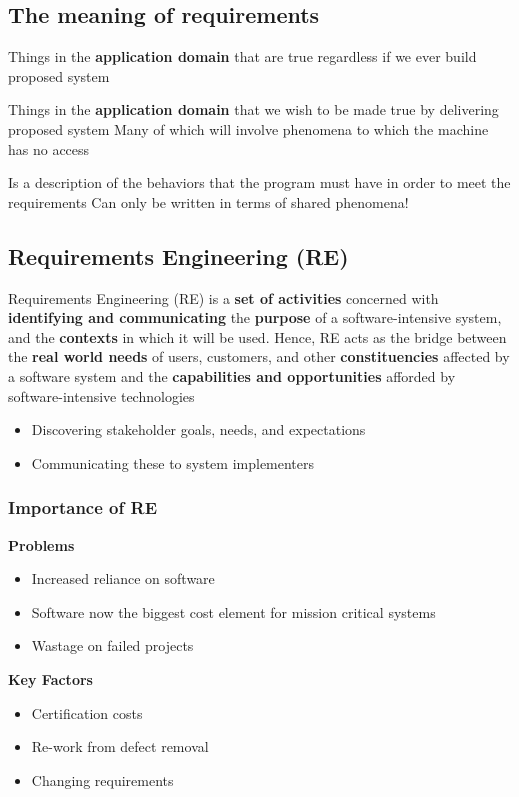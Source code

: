 \documentclass{report}
\begin{document}
\subsection{The meaning of requirements}
\begin{description}
  \setlength\itemsep{-.25em}
  \item [Domain Properties] Things in the \textbf{application domain} that are true regardless if we ever build  proposed system
  \item [Requirements] Things in the \textbf{application domain} that we wish to be made true by delivering proposed system\newline
Many of which will involve phenomena to which the machine has no
access
  \item [A Specification] Is a description of the behaviors that the program must have in order to meet the requirements\newline 
Can only be written in terms of shared phenomena!
\end{description}

\subsection{Requirements Engineering (RE)}
Requirements Engineering (RE) is a \textbf{set of activities} concerned with \textbf{identifying and communicating} the \textbf{purpose} of a software-intensive system, and the \textbf{contexts} in which it will be used. Hence, RE acts as the bridge between the \textbf{real world needs} of users, customers, and other \textbf{constituencies} affected by a software system and the \textbf{capabilities and opportunities} afforded by software-intensive technologies
\begin{itemize}
  \setlength\itemsep{-.25em}
  \item Discovering stakeholder goals, needs, and expectations
  \item Communicating these to system implementers
\end{itemize}

\subsubsection{Importance of RE}
\textbf{Problems}
\begin{itemize}
  \setlength\itemsep{-.25em}
  \item Increased reliance on software
  \item Software now the biggest cost element for mission critical systems
  \item Wastage on failed projects
\end{itemize}
\textbf{Key Factors}
\begin{itemize}
  \setlength\itemsep{-.25em}
  \item Certification costs
  \item Re-work from defect removal
  \item Changing requirements
\end{itemize}
\end{document}
